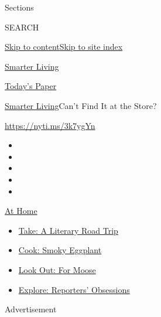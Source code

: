 Sections

SEARCH

\protect\hyperlink{site-content}{Skip to
content}\protect\hyperlink{site-index}{Skip to site index}

\href{https://www.nytimes.com/section/smarter-living}{Smarter Living}

\href{https://myaccount.nytimes.com/auth/login?response_type=cookie\&client_id=vi}{}

\href{https://www.nytimes.com/section/todayspaper}{Today's Paper}

\href{/section/smarter-living}{Smarter Living}\textbar{}Can't Find It at
the Store?

\url{https://nyti.ms/3k7ygYn}

\begin{itemize}
\item
\item
\item
\item
\item
\end{itemize}

\href{https://www.nytimes.com/spotlight/at-home?action=click\&pgtype=Article\&state=default\&region=TOP_BANNER\&context=at_home_menu}{At
Home}

\begin{itemize}
\tightlist
\item
  \href{https://www.nytimes.com/2020/07/28/books/time-for-a-literary-road-trip.html?action=click\&pgtype=Article\&state=default\&region=TOP_BANNER\&context=at_home_menu}{Take:
  A Literary Road Trip}
\item
  \href{https://www.nytimes.com/2020/07/29/magazine/bored-with-your-home-cooking-some-smoky-eggplant-will-fix-that.html?action=click\&pgtype=Article\&state=default\&region=TOP_BANNER\&context=at_home_menu}{Cook:
  Smoky Eggplant}
\item
  \href{https://www.nytimes.com/2020/07/27/travel/moose-michigan-isle-royale.html?action=click\&pgtype=Article\&state=default\&region=TOP_BANNER\&context=at_home_menu}{Look
  Out: For Moose}
\item
  \href{https://www.nytimes.com/interactive/2020/at-home/even-more-reporters-editors-diaries-lists-recommendations.html?action=click\&pgtype=Article\&state=default\&region=TOP_BANNER\&context=at_home_menu}{Explore:
  Reporters' Obsessions}
\end{itemize}

Advertisement

